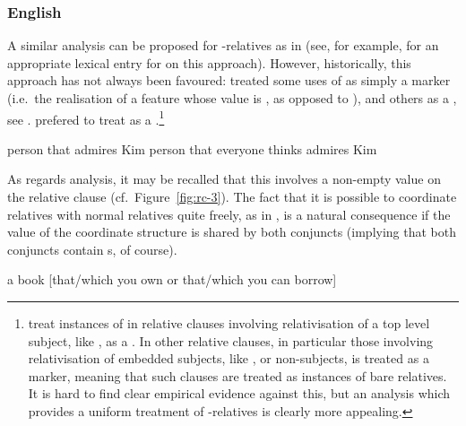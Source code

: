 \documentclass[output=paper
 	        ,biblatex
                ,babelshorthands
                ,newtxmath
                ,draftmode
                ,colorlinks, citecolor=brown
]{langscibook}
\begin{document}
\subsubsection{English}
\label{sec:rc-english}

A similar analysis can be proposed for  -relatives as in
 (see, for example, \crossrefchaptert[\page \pageref{fig:UDC:59}]{udc} for an
appropriate lexical entry for  on this approach).  However,
historically, this approach has not always been favoured: \citet{Pollard:Sag:94} treated some uses of
 as simply a marker (i.e.\ the realisation of a  feature whose value
is , as opposed to ), and
others as  a , see . 
\citet[462--464]{Sag:97} prefered to treat  as
a .\footnote{\label{fn:rc-4}\citet[Section~5.2.3]{Pollard:Sag:94} treat instances of 
   in relative clauses involving relativisation of a top level subject, like ,
  as a .  In other relative clauses, in particular those involving
  relativisation of embedded subjects, like 
  , or non-subjects,  is treated as a marker, meaning that such
  clauses are treated as instances of bare relatives. It is hard to find clear empirical
  evidence against this, but an analysis which provides a uniform treatment of 
  -relatives is clearly more appealing.}
\begin{exe}\ex\begin{xlist}\label{x:rc-59}
  \ex\label{x:rc-60} person that \trace admires Kim
  \ex\label{x:rc-61} person that everyone thinks \trace admires Kim
\end{xlist}\end{exe}
As regards  analysis, it may be recalled that this involves a
non-empty  value on the relative clause (cf.\ Figure~\ref{fig:rc-3}). The fact that it
is possible to coordinate  relatives with normal
relatives quite freely, as in , is a natural consequence if the
 value of the coordinate structure is shared by both conjuncts (implying that
both conjuncts contain s, of course).
\begin{exe}\ex\label{x:rc-62}
 a book [that/which you own or that/which you can borrow]
\end{exe}
\end{document}
